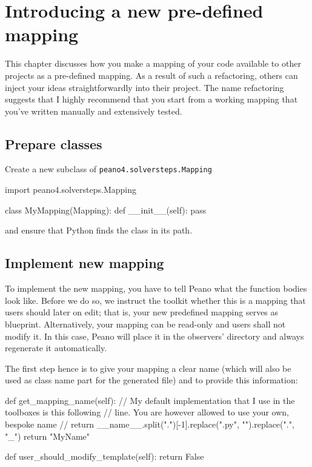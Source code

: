 \chapter{Introducing a new pre-defined mapping}
\label{section:logging}

This chapter discusses how you make a mapping of your code available to other
projects as a pre-defined mapping.
As a result of such a refactoring, others can inject your ideas
straightforwardly into their project.
The name refactoring suggests that I highly recommend that you start from a
working mapping that you've written manually and extensively tested.

\section{Prepare classes}

Create a new subclass of \texttt{peano4.solversteps.Mapping}

\begin{code}
import peano4.solversteps.Mapping

class MyMapping(Mapping):
  def __init__(self):
    pass
\end{code}

\noindent
and ensure that Python finds the class in its path.


\section{Implement new mapping}

To implement the new mapping, you have to tell Peano what the function bodies
look like.
Before we do so, we instruct the toolkit whether this is a mapping that users
should later on edit; 
that is, your new predefined mapping serves as blueprint.
Alternatively, your mapping can be read-only and users shall not modify it.
In this case, Peano will place it in the observers' directory and always
regenerate it automatically.


The first step hence is to give your mapping a clear name (which will also be
used as class name part for the generated file) and to provide this information:


\begin{code}
  def get_mapping_name(self):
    // My default implementation that I use in the toolboxes is this following
    // line. You are however allowed to use your own, bespoke name
    // return __name__.split(".")[-1].replace(".py", "").replace(".", "_")
    return "MyName"

  def user_should_modify_template(self):
    return False
\end{code}


